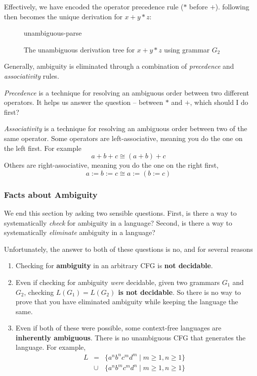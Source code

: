 Effectively, we have encoded the operator precedence rule ($*$ before $+$).  following then becomes the unique derivation for $x + y * z$:

\begin{figure}[H]
    \centering
    {unambiguous-parse}
    \caption{The unambiguous derivation tree for $x+y*z$ using grammar $G_2$}
    \label{figure:unambiguous-parse}
\end{figure}

Generally, ambiguity is eliminated through a combination of \textit{precedence} and \textit{associativity} rules. 

\textit{Precedence} is a technique for resolving an ambiguous order between two different operators. It helps us answer the question -- between $*$ and $+$, which should I do first?

\textit{Associativity} is a technique for resolving an ambiguous order between two of the same operator. Some operators are left-associative, meaning you do the one on the left first. For example
\[a + b + c \cong (a + b) + c\]
Others are right-associative, meaning you do the one on the right first,
\[a := b := c \cong a:= (b := c) \]
\subsubsection{Facts about Ambiguity}
We end this section by asking two sensible questions. First, is there a way to systematically \textit{check} for ambiguity in a language? Second, is there a way to systematically \textit{eliminate} ambiguity in a language?

Unfortunately, the answer to both of these questions is no, and for several reasons
\begin{enumerate}
\item Checking for \textbf{ambiguity} in an arbitrary CFG is \textbf{not decidable}.
\item Even if checking for ambiguity \textit{were} decidable, given two grammars $G_1$ and $G_2$, checking
\textbf{$L(G_1) = L(G_2)$ is not decidable}. So there is no way to prove that you have eliminated ambiguity while keeping the language the same.
\item Even if both of these were possible, some context-free languages are \textbf{inherently ambiguous}. There is no unambiguous CFG that generates the language. For example,
\[
\begin{array}{lll}
  L &=& \{ a^nb^nc^md^m \mid m \ge 1, n \ge 1 \}\\
  &\cup& \{ a^nb^mc^md^n \mid m \ge 1, n \ge 1 \}
\end{array}
\]
\end{enumerate}

